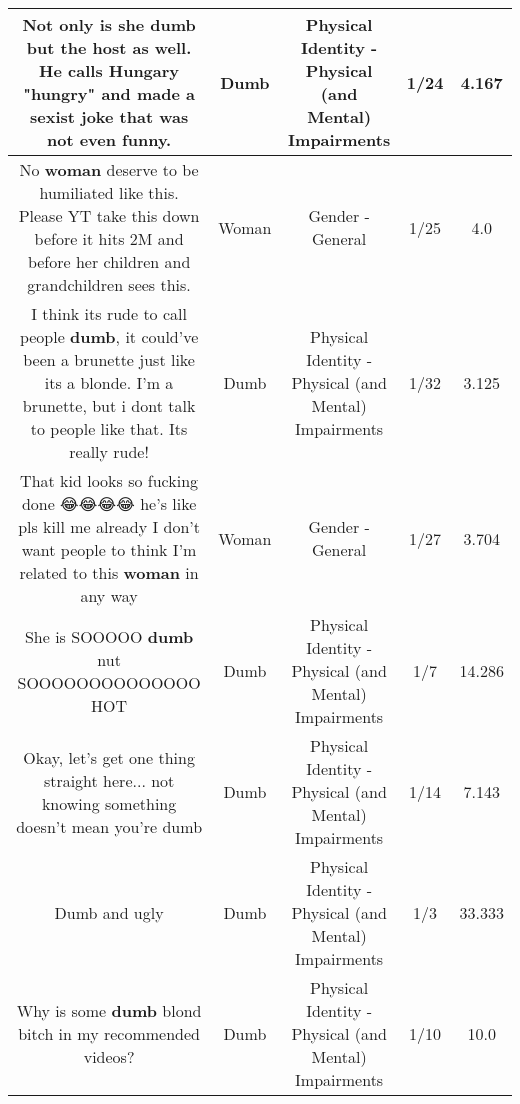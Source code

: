 \documentclass[11pt]{article}
\newlength\mylength
\begin{document}
\begin{center}
\begin{longtable}{|C{.65\mylength}|C{.30\mylength}|C{.12\mylength}|C{.12\mylength}|C{.12\mylength}|}
  \small Not only is she \textbf{dumb} but the host as well. He calls Hungary "hungry" and made a sexist joke that was not even funny.\normalsize   & Dumb & Physical Identity - Physical (and Mental) Impairments & 1/24 & 4.167 \\  \hline
  \small No \textbf{woman} deserve to be humiliated like this. Please YT take this down before it hits 2M and before her children and grandchildren sees this.\normalsize   & Woman & Gender - General & 1/25 & 4.0 \\  \hline
  \small I think its rude to call people \textbf{dumb}, it could've been a brunette just like its a blonde. I'm a brunette, but i dont talk to people like that. Its really rude!\normalsize   & Dumb & Physical Identity - Physical (and Mental) Impairments & 1/32 & 3.125 \\  \hline
  \small That kid looks so fucking done 😂😂😂😂 he's like pls kill  me already I don't want people to think I'm related to this \textbf{woman} in any way\normalsize   & Woman & Gender - General & 1/27 & 3.704 \\  \hline
  \small She is SOOOOO \textbf{dumb} nut SOOOOOOOOOOOOOO HOT\normalsize   & Dumb & Physical Identity - Physical (and Mental) Impairments & 1/7 & 14.286 \\  \hline
  \small Okay, let's get one thing straight here... not knowing something doesn't mean you're dumb\normalsize   & Dumb & Physical Identity - Physical (and Mental) Impairments & 1/14 & 7.143 \\  \hline
  \small Dumb and ugly\normalsize   & Dumb & Physical Identity - Physical (and Mental) Impairments & 1/3 & 33.333 \\  \hline
  \small Why is some \textbf{dumb} blond bitch in my recommended videos?\normalsize   & Dumb & Physical Identity - Physical (and Mental) Impairments & 1/10 & 10.0 \\  \hline

\end{longtable}
\end{center}
\end{document}

